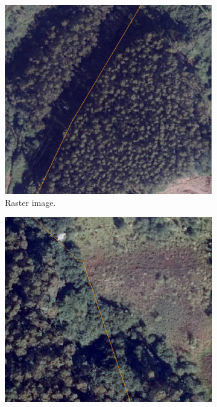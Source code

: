  \begin{figure}[H]
\centering
\begin{subfigure}{0.32\textwidth}
\centering
\includegraphics[width = \textwidth]{IMAGENES/Intersection1.png}
\caption{Raster image.}
\label{fig:left}
\end{subfigure}
\begin{subfigure}{0.328\textwidth}
\centering
\includegraphics[width = \textwidth]{IMAGENES/Intersection2.png}

\end{subfigure}
\end{figure}
